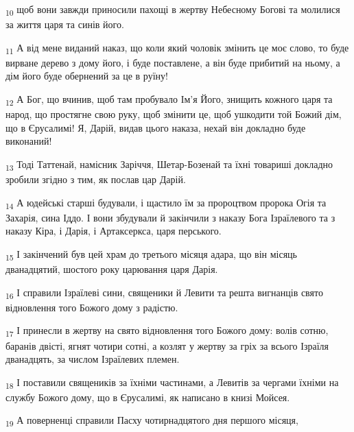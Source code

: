\begin{tcolorbox}
\textsubscript{10} щоб вони завжди приносили пахощі в жертву Небесному Богові та молилися за життя царя та синів його.
\end{tcolorbox}
\begin{tcolorbox}
\textsubscript{11} А від мене виданий наказ, що коли який чоловік змінить це моє слово, то буде вирване дерево з дому його, і буде поставлене, а він буде прибитий на ньому, а дім його буде обернений за це в руїну!
\end{tcolorbox}
\begin{tcolorbox}
\textsubscript{12} А Бог, що вчинив, щоб там пробувало Ім'я Його, знищить кожного царя та народ, що простягне свою руку, щоб змінити це, щоб ушкодити той Божий дім, що в Єрусалимі! Я, Дарій, видав цього наказа, нехай він докладно буде виконаний!
\end{tcolorbox}
\begin{tcolorbox}
\textsubscript{13} Тоді Таттенай, намісник Заріччя, Шетар-Бозенай та їхні товариші докладно зробили згідно з тим, як послав цар Дарій.
\end{tcolorbox}
\begin{tcolorbox}
\textsubscript{14} А юдейські старші будували, і щастило їм за пророцтвом пророка Огія та Захарія, сина Іддо. І вони збудували й закінчили з наказу Бога Ізраїлевого та з наказу Кіра, і Дарія, і Артаксеркса, царя перського.
\end{tcolorbox}
\begin{tcolorbox}
\textsubscript{15} І закінчений був цей храм до третього місяця адара, що він місяць дванадцятий, шостого року царювання царя Дарія.
\end{tcolorbox}
\begin{tcolorbox}
\textsubscript{16} І справили Ізраїлеві сини, священики й Левити та решта вигнанців свято відновлення того Божого дому з радістю.
\end{tcolorbox}
\begin{tcolorbox}
\textsubscript{17} І принесли в жертву на свято відновлення того Божого дому: волів сотню, баранів двісті, ягнят чотири сотні, а козлят у жертву за гріх за всього Ізраїля дванадцять, за числом Ізраїлевих племен.
\end{tcolorbox}
\begin{tcolorbox}
\textsubscript{18} І поставили священиків за їхніми частинами, а Левитів за чергами їхніми на службу Божого дому, що в Єрусалимі, як написано в книзі Мойсея.
\end{tcolorbox}
\begin{tcolorbox}
\textsubscript{19} А поверненці справили Пасху чотирнадцятого дня першого місяця,
\end{tcolorbox}
